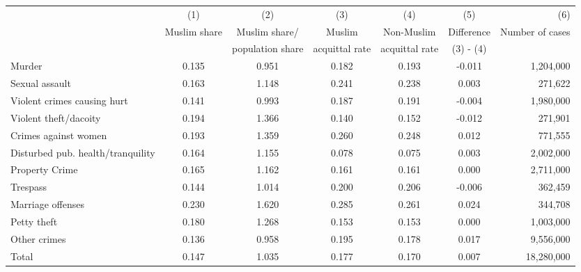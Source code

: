 {
\def\sym#1{\ifmmode^{#1}\else\(^{#1}\)\fi}
\begin{tabular}{lcccccr}
  \hline\hline
&\multicolumn{1}{c}{(1)}&\multicolumn{1}{c}{(2)}&\multicolumn{1}{c}{(3)}&\multicolumn{1}{c}{(4)}&\multicolumn{1}{c}{(5)}&\multicolumn{1}{r}{(6)}\\
&{Muslim share}&{Muslim share/}&{Muslim}&{Non-Muslim} &  {Difference} & {Number of cases}\\
&{}&{population share}&{acquittal rate}&{acquittal rate} & {(3) - (4)} & {}\\
\hline
Murder & 0.135 & 0.951 & 0.182 & 0.193 & -0.011 & 1,204,000\\
Sexual assault & 0.163 & 1.148 & 0.241 & 0.238 & 0.003 & 271,622\\
Violent crimes causing hurt & 0.141 & 0.993 & 0.187 & 0.191 & -0.004 & 1,980,000\\
Violent theft/dacoity & 0.194 & 1.366 & 0.140 & 0.152 & -0.012 & 271,901\\
Crimes against women & 0.193 & 1.359 & 0.260 & 0.248 & 0.012 & 771,555\\
Disturbed pub. health/tranquility & 0.164 & 1.155 & 0.078 & 0.075 & 0.003 & 2,002,000\\
Property Crime & 0.165 & 1.162 & 0.161 & 0.161 & 0.000 & 2,711,000\\
Trespass & 0.144 & 1.014 & 0.200 & 0.206 & -0.006 & 362,459\\
Marriage offenses & 0.230 & 1.620 & 0.285 & 0.261 & 0.024 & 344,708\\
Petty theft & 0.180 & 1.268 & 0.153 & 0.153 & 0.000 & 1,003,000\\
Other crimes & 0.136 & 0.958 & 0.195 & 0.178 & 0.017 & 9,556,000\\
\hline
Total & 0.147 & 1.035 & 0.177 & 0.170 & 0.007 & 18,280,000\\
\hline\hline
\end{tabular}
}
